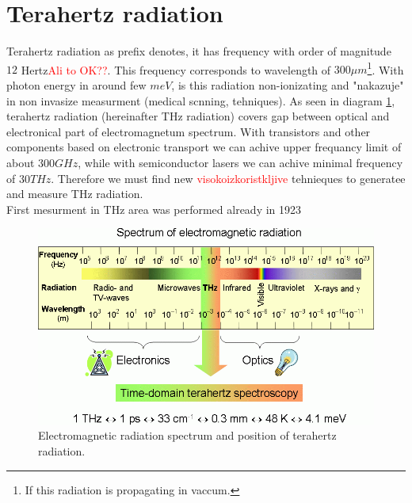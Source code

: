 \documentclass[english,11pt,a4paper]{article}
\numberwithin{equation}{section} %
\numberwithin{figure}{section} %
\numberwithin{table}{section} %
\begin{document}
\section{Terahertz radiation}
Terahertz radiation as prefix denotes, it has frequency with order of magnitude $12$ Hertz\textcolor{red}{Ali to OK??}. This frequency corresponds to wavelength of $300\mu m$\footnote{If this radiation is propagating in vaccum.}. With photon energy in around few $meV$, is this radiation non-ionizating and "nakazuje" in non invasize measurment (medical scnning, tehniques). As seen in diagram \ref{em-spectrum}, terahertz radiation (hereinafter THz radiation) covers gap between optical and electronical part of electromagnetum spectrum. With transistors and other components based on electronic transport we can achive upper frequancy limit of about $300GHz$, while with semiconductor lasers we can achive minimal frequency of $30THz$. Therefore we must find new \textcolor{red}{visokoizkoristkljive} tehnieques to generatee and measure THz radiation.\\
First mesurment in THz area was performed already in 1923 \cite{first-thz-measurment}


 
 
 
\begin{figure}[!htb]
\label{em-spectrum}
\centering
\includegraphics[scale=0.5]{slike/spectrum_b.png}
\caption{Electromagnetic radiation spectrum and position of terahertz radiation. \cite{em-spectrum}}
\end{figure}
\end{document}
